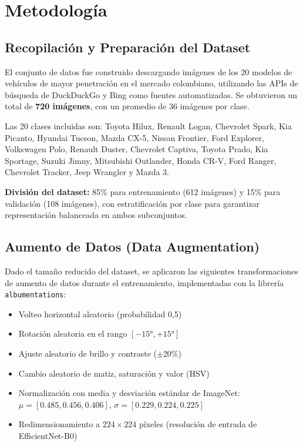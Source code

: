 \documentclass[12pt,a4paper]{article}
\begin{document}
\section{Metodología}

\subsection{Recopilación y Preparación del Dataset}

El conjunto de datos fue construido descargando imágenes de los 20 modelos de vehículos de mayor penetración en el mercado colombiano, utilizando las APIs de búsqueda de DuckDuckGo y Bing como fuentes automatizadas. Se obtuvieron un total de \textbf{720 imágenes}, con un promedio de 36 imágenes por clase.

Las 20 clases incluidas son: Toyota Hilux, Renault Logan, Chevrolet Spark, Kia Picanto, Hyundai Tucson, Mazda CX-5, Nissan Frontier, Ford Explorer, Volkswagen Polo, Renault Duster, Chevrolet Captiva, Toyota Prado, Kia Sportage, Suzuki Jimny, Mitsubishi Outlander, Honda CR-V, Ford Ranger, Chevrolet Tracker, Jeep Wrangler y Mazda 3.

\textbf{División del dataset:} 85\% para entrenamiento (612 imágenes) y 15\% para validación (108 imágenes), con estratificación por clase para garantizar representación balanceada en ambos subconjuntos.

\subsection{Aumento de Datos (Data Augmentation)}

Dado el tamaño reducido del dataset, se aplicaron las siguientes transformaciones de aumento de datos durante el entrenamiento, implementadas con la librería \texttt{albumentations}:

\begin{itemize}
    \item Volteo horizontal aleatorio (probabilidad 0,5)
    \item Rotación aleatoria en el rango $[-15°, +15°]$
    \item Ajuste aleatorio de brillo y contraste ($\pm$20\%)
    \item Cambio aleatorio de matiz, saturación y valor (HSV)
    \item Normalización con media y desviación estándar de ImageNet: $\mu = [0.485, 0.456, 0.406]$, $\sigma = [0.229, 0.224, 0.225]$
    \item Redimensionamiento a $224 \times 224$ píxeles (resolución de entrada de EfficientNet-B0)
\end{itemize}
\end{document}
